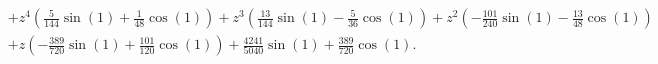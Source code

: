 \begin{description}
\begin{displaymath}
\begin{split}
                             &+ z^{4} \left(\frac{5}{144} \sin{\left (1 \right )} + \frac{1}{48} \cos{\left (1 \right )}\right) + z^{3} \left(\frac{13}{144} \sin{\left (1 \right )} - \frac{5}{36} \cos{\left (1 \right )}\right) + z^{2} \left(- \frac{101}{240} \sin{\left (1 \right )} - \frac{13}{48} \cos{\left (1 \right )}\right) \\
                             &+ z \left(- \frac{389}{720} \sin{\left (1 \right )} + \frac{101}{120} \cos{\left (1 \right )}\right) + \frac{4241}{5040} \sin{\left (1 \right )} + \frac{389}{720} \cos{\left (1 \right )}.
    \end{split}
\end{displaymath}
\end{description}
